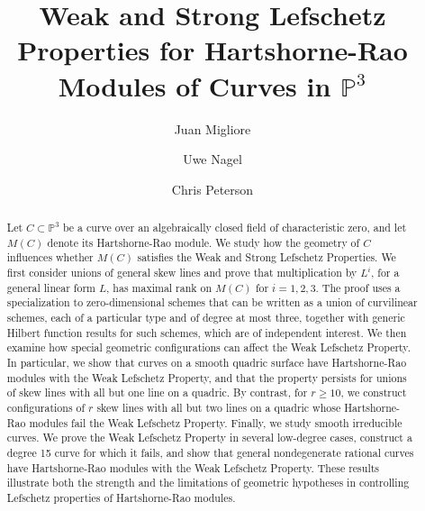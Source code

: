 \documentclass[12pt]{amsart}%
\numberwithin{equation}{section}
\theoremstyle{definition}
\numberwithin{equation}{section}
\begin{document}
\begin{abstract} Let $C\subset \mathbb P^3$ be a curve over an algebraically closed field of characteristic zero, and let $M(C)$ denote its Hartshorne-Rao module. We study how the geometry of $C$ influences whether $M(C)$ satisfies the Weak and Strong Lefschetz Properties. We first consider unions of general skew lines and prove that multiplication by $L^i$, for a general linear form $L$, has maximal rank on $M(C)$ for $i=1,2,3$. The proof uses a specialization to zero-dimensional schemes that can be written as a union of curvilinear schemes, each of a particular type and of degree at most three, together with generic Hilbert function results for such schemes, which are of independent interest. We then examine how special geometric configurations can affect the Weak Lefschetz Property. In particular, we show that curves on a smooth quadric surface have Hartshorne-Rao modules with the Weak Lefschetz Property, and that the property persists for unions of skew lines with all but one line on a quadric. By contrast, for $r\geq 10$, we construct configurations of $r$ skew lines with all but two lines on a quadric whose Hartshorne-Rao modules fail the Weak Lefschetz Property. Finally, we study smooth irreducible curves. We prove the Weak Lefschetz Property in several low-degree cases, construct a degree 15 curve for which it fails, and show that general nondegenerate rational curves have Hartshorne-Rao modules with the Weak Lefschetz Property. These results illustrate both the strength and the limitations of geometric hypotheses in controlling Lefschetz properties of Hartshorne-Rao modules.
\end{abstract}

\title[Lefschetz Properties for Hartshorne-Rao Modules of Curves in $\mathbb P^3$]{Weak and Strong Lefschetz Properties for Hartshorne-Rao Modules of Curves in $\mathbb P^3$}

\author[J.~Migliore]{Juan Migliore} 
\address[J.~Migliore]{Department of Mathematics,
University of Notre Dame,
Notre Dame, IN 46556, USA}

\author[U. Nagel]{Uwe Nagel}
\address[U. Nagel]{Department of Mathematics, University of Kentucky, 715 Patterson Office Tower, Lexington,
KY 40506,  USA}

\author[C. Peterson]{Chris Peterson}
\address[C. Peterson]{Department of Mathematics, Colorado State University, Fort Collins, CO 80523, USA}
\end{document}
